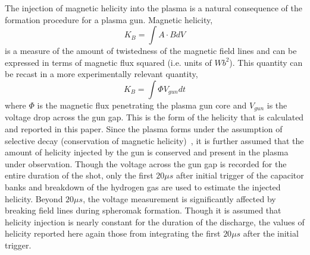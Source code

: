 \documentclass[aps,prl,amsmath,amssymb,reprint,superscriptaddress]{revtex4-1} %
\begin{document}
The injection of magnetic helicity into the plasma is a natural consequence of the formation procedure for a plasma gun. Magnetic helicity,
%
\begin{equation}
K_{B} = \int A \cdot B dV
\label{eq:helicity_th}
\end{equation}
%
is a measure of the amount of twistedness of the magnetic field lines and can be expressed in terms of magnetic flux squared (i.e. units of $Wb^{2}$). This quantity can be recast in a more experimentally relevant quantity, 
%
\begin{equation}
K_{B} = \int \Phi V_{gun} dt
\label{eq:helicity_exp}
\end{equation}
%
where $\Phi$ is the magnetic flux penetrating the plasma gun core and $V_{gun}$ is the voltage drop across the gun gap. This is the form of the helicity that is calculated and reported in this paper. Since the plasma forms under the assumption of selective decay (conservation of magnetic helicity)~\cite{Gray13}, it is further assumed that the amount of helicity injected by the gun is conserved and present in the plasma under observation. Though the voltage across the gun gap is recorded for the entire duration of the shot, only the first $20 \mu s$ after initial trigger of the capacitor banks and breakdown of the hydrogen gas are used to estimate the injected helicity. Beyond $20 \mu s$, the voltage measurement is significantly affected by breaking field lines during spheromak formation. Though it is assumed that helicity injection is nearly constant for the duration of the discharge, the values of helicity reported here again those from integrating the first $20 \mu s$ after the initial trigger.
\end{document}
